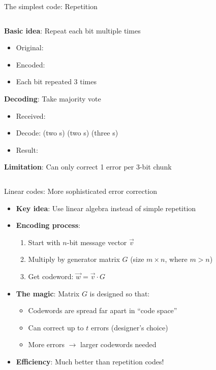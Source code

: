 \documentclass[aspectratio=169, lualatex, handout]{beamer}
\begin{document}
\begin{frame}{The simplest code: Repetition}
	\begin{columns}[c]
		\begin{column}{1\textwidth}
			\textbf{Basic idea}: Repeat each bit multiple times
			\begin{itemize}
				\item Original: 
				\item Encoded: 
				\item Each bit repeated 3 times
			\end{itemize}

			\textbf{Decoding}: Take majority vote
			\begin{itemize}
				\item Received: 
				\item Decode: \bit{0} (two s) \bit{1} (two s)  (three s)
				\item Result: 
			\end{itemize}

			\textbf{Limitation}: Can only correct 1 error per 3-bit chunk
		\end{column}
	\end{columns}
\end{frame}

\begin{frame}{Linear codes: More sophisticated error correction}
	\begin{itemize}
		\item \textbf{Key idea}: Use linear algebra instead of simple repetition
		\item \textbf{Encoding process}:
		      \begin{enumerate}
			      \item Start with $n$-bit message vector $\vec{v}$
			      \item Multiply by generator matrix $G$ (size $m \times n$, where $m > n$)
			      \item Get codeword: $\vec{w} = \vec{v} \cdot G$
		      \end{enumerate}
		\item \textbf{The magic}: Matrix $G$ is designed so that:
		      \begin{itemize}
			      \item Codewords are spread far apart in ``code space''
			      \item Can correct up to $t$ errors (designer's choice)
			      \item More errors $\rightarrow$ larger codewords needed
		      \end{itemize}
		\item \textbf{Efficiency}: Much better than repetition codes!
	\end{itemize}
\end{frame}
\end{document}
